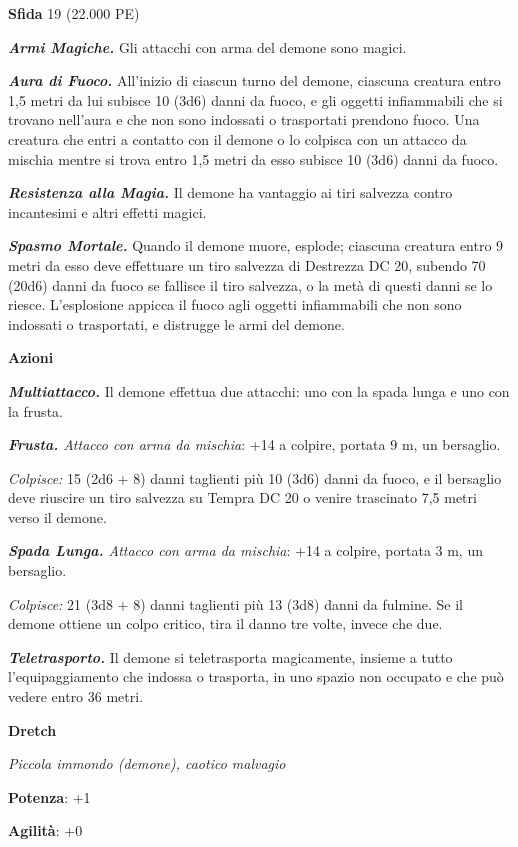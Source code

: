 \begin{multicols}{2}
\textbf{Sfida} 19 (22.000 PE)\smallskip

\emph{\textbf{Armi Magiche.}} Gli attacchi con arma del demone sono
magici.

\emph{\textbf{Aura di Fuoco.}} All'inizio di ciascun turno del demone,
ciascuna creatura entro 1,5 metri da lui subisce 10 (3d6) danni da
fuoco, e gli oggetti infiammabili che si trovano nell'aura e che non
sono indossati o trasportati prendono fuoco. Una creatura che entri a
contatto con il demone o lo colpisca con un attacco da mischia mentre si
trova entro 1,5 metri da esso subisce 10 (3d6) danni da fuoco.

\emph{\textbf{Resistenza alla Magia.}} Il demone ha vantaggio ai tiri
salvezza contro incantesimi e altri effetti magici.

\emph{\textbf{Spasmo Mortale.}} Quando il demone muore, esplode;
ciascuna creatura entro 9 metri da esso deve effettuare un tiro salvezza
di Destrezza DC 20, subendo 70 (20d6) danni da fuoco se fallisce il tiro
salvezza, o la metà di questi danni se lo riesce. L'esplosione appicca
il fuoco agli oggetti infiammabili che non sono indossati o trasportati,
e distrugge le armi del demone.

\smallskip\textbf{Azioni}

\emph{\textbf{Multiattacco.}} Il demone effettua due attacchi: uno con
la spada lunga e uno con la frusta.

\emph{\textbf{Frusta.} Attacco con arma da mischia}: +14 a colpire,
portata 9 m, un bersaglio.

\emph{Colpisce:} 15 (2d6 + 8) danni taglienti più 10 (3d6) danni da
fuoco, e il bersaglio deve riuscire un tiro salvezza su Tempra DC 20 o
venire trascinato 7,5 metri verso il demone.

\emph{\textbf{Spada Lunga.} Attacco con arma da mischia}: +14 a colpire,
portata 3 m, un bersaglio.

\emph{Colpisce:} 21 (3d8 + 8) danni taglienti più 13 (3d8) danni da
fulmine. Se il demone ottiene un colpo critico, tira il danno tre volte,
invece che due.

\emph{\textbf{Teletrasporto.}} Il demone si teletrasporta magicamente,
insieme a tutto l'equipaggiamento che indossa o trasporta, in uno spazio
non occupato e che può vedere entro 36 metri.

\textbf{Dretch}

\emph{Piccola immondo (demone), caotico malvagio}

\textbf{Potenza}: +1

\textbf{Agilità}: +0


\end{multicols}
